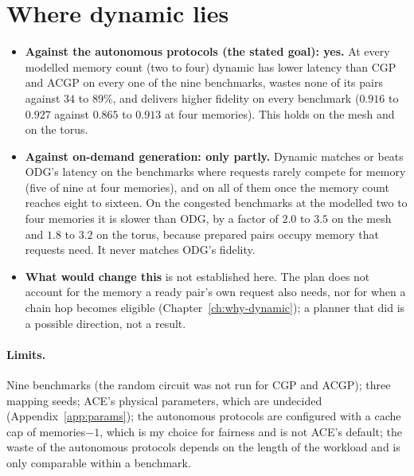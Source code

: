\section{Where dynamic lies}
\begin{itemize}
  \item \textbf{Against the autonomous protocols (the stated goal): yes.} At every modelled memory count (two to four) dynamic has lower latency than CGP and ACGP on every one of the nine benchmarks, wastes none of its pairs against $34$ to $89\%$,
    and delivers higher fidelity on every benchmark ($0.916$ to $0.927$ against $0.865$ to $0.913$ at four memories). This holds on the mesh and on the torus.
  \item \textbf{Against on-demand generation: only partly.} Dynamic matches or beats ODG's latency on the benchmarks where requests rarely compete for memory (five of nine at four memories), and on all of them once the memory count reaches eight to sixteen. On the
    congested benchmarks at the modelled two to four memories it is slower than ODG, by a factor of $2.0$ to $3.5$ on the mesh and $1.8$ to $3.2$ on the torus, because prepared pairs occupy memory that requests need. It never matches ODG's fidelity.
  \item \textbf{What would change this} is not established here. The plan does not account for the memory a ready pair's own request also needs, nor for when a chain hop becomes eligible (Chapter~\ref{ch:why-dynamic}); a planner that did is a possible
    direction, not a result.
\end{itemize}
\paragraph{Limits.} Nine benchmarks (the random circuit was not run for CGP and ACGP); three mapping seeds; ACE's physical parameters, which are undecided (Appendix~\ref{app:params}); the autonomous protocols are configured with a cache cap of memories$-1$, which is my choice for fairness
and is not ACE's default; the waste of the autonomous protocols depends on the length of the workload and is only comparable within a benchmark.
